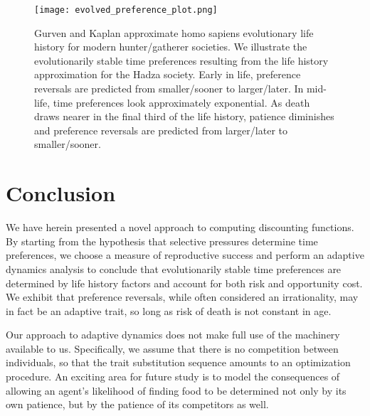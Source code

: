 \documentclass[titlepage, hidelinks, 12pt]{article}
\theoremstyle{plain}
\theoremstyle{remark}
\theoremstyle{definition}
\begin{document}
\begin{figure}[h]
    \centering
    \texttt{[image: evolved\_preference\_plot.png]}
    \caption{Gurven and Kaplan \cite{gurven07} approximate homo sapiens evolutionary life history for modern hunter/gatherer societies. 
    We illustrate the evolutionarily stable time preferences resulting from the life history approximation for the Hadza society. Early in life,
preference reversals are predicted from smaller/sooner to larger/later. In mid-life, time preferences look approximately exponential. As death
draws nearer in the final third of the life history, patience diminishes and preference reversals are predicted from larger/later to smaller/sooner.}
\end{figure}























\section{Conclusion}
We have herein presented a novel approach to computing discounting functions. 
By starting from the hypothesis that selective pressures determine time preferences,
we choose a measure of reproductive success and perform an adaptive dynamics analysis to conclude that evolutionarily stable time preferences are 
determined by life history factors and account
for both risk and opportunity cost. We exhibit that preference reversals, while often considered an irrationality, may in fact be an adaptive trait,
so long as risk of death is not constant in age. 

Our approach to adaptive dynamics does not make full use of the machinery available to us. Specifically, we assume that there is no competition between
individuals, so that the trait substitution sequence amounts to an optimization procedure. An exciting area for future study is to model the 
consequences of allowing an agent's likelihood of finding food to be determined not only by its own patience, but by the patience of
its competitors as well. 

\newpage

{}
\end{document}
